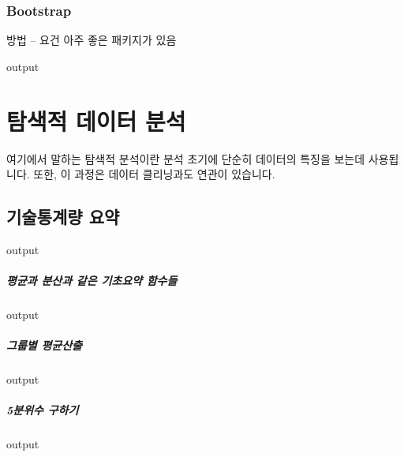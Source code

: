 \documentclass{report}
\begin{document}
\subsection{Bootstrap} 
방법 -- 요건 아주 좋은 패키지가 있음 
\begin{Schunk}
\begin{Soutput}
output
\end{Soutput}
\end{Schunk}


%
%
%

\chapter{탐색적 데이터 분석}

여기에서 말하는 탐색적 분석이란 분석 초기에 단순히 데이터의 특징을 보는데 사용됩니다. 
또한, 이 과정은 데이터 클리닝과도 연관이 있습니다. 

\section{기술통계량 요약}
\begin{Schunk}
\begin{Soutput}
output
\end{Soutput}
\end{Schunk}

\paragraph{평균과 분산과 같은 기초요약 함수들}
\begin{Schunk}
\begin{Soutput}
output
\end{Soutput}
\end{Schunk}

\paragraph{그룹별 평균산출}
\begin{Schunk}
\begin{Soutput}
output
\end{Soutput}
\end{Schunk}

\paragraph{5분위수 구하기}
\begin{Schunk}
\begin{Soutput}
output
\end{Soutput}
\end{Schunk}
\end{document}
